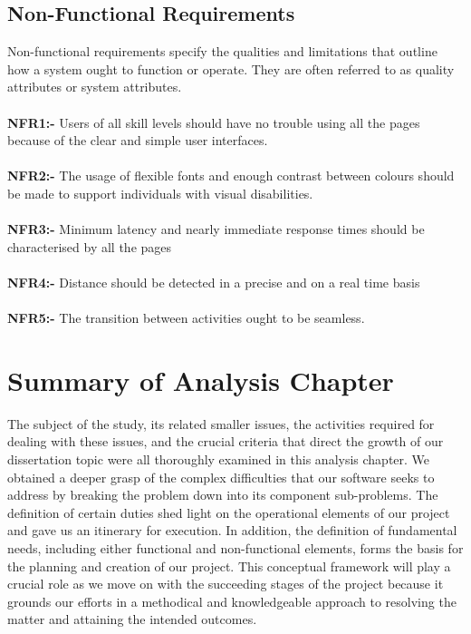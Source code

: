 \documentclass[MScCS]{uccthesis}
\begin{document}
\subsection{Non-Functional Requirements}

Non-functional requirements specify the qualities and limitations that outline how a system ought to function or operate. They are often referred to as quality attributes or system attributes. \\
\\
\textbf{NFR1:-} Users of all skill levels should have no trouble using all the pages because of the clear and simple user interfaces.
\\
\\\textbf{NFR2:-} The usage of flexible fonts and enough contrast between colours should be made 	to support individuals with visual disabilities.
\\
\\\textbf{NFR3:-} Minimum latency and nearly immediate response times should be characterised by all the pages
\\
\\\textbf{NFR4:-} Distance should be detected in a precise and on a real time basis
\\
\\\textbf{NFR5:-} The transition between activities ought to be seamless.

\section{Summary of Analysis Chapter}
The subject of the study, its related smaller issues, the activities required for dealing with these issues, and the crucial criteria that direct the growth of our dissertation topic were all thoroughly examined in this analysis chapter. We obtained a deeper grasp of the complex difficulties that our software seeks to address by breaking the problem down into its component sub-problems. The definition of certain duties shed light on the operational elements of our project and gave us an itinerary for execution. In addition, the definition of fundamental needs, including either functional and non-functional elements, forms the basis for the planning and creation of our project. This conceptual framework will play a crucial role as we move on with the succeeding stages of the project because it grounds our efforts in a methodical and knowledgeable approach to resolving the matter and attaining the intended outcomes.
\end{document}
